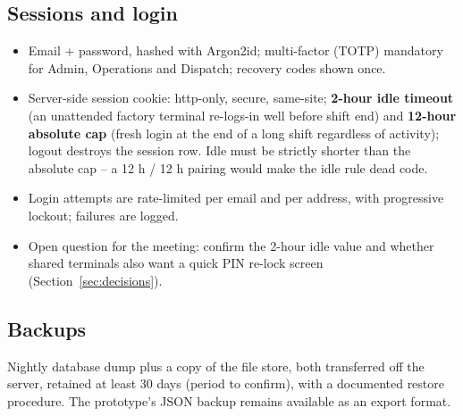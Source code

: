 \subsection*{Sessions and login}

\begin{itemize}
  \item Email + password, hashed with Argon2id; multi-factor (TOTP) mandatory for Admin,
        Operations and Dispatch; recovery codes shown once.
  \item Server-side session cookie: http-only, secure, same-site; \textbf{2-hour idle
        timeout} (an unattended factory terminal re-logs-in well before shift end) and
        \textbf{12-hour absolute cap} (fresh login at the end of a long shift regardless
        of activity); logout destroys the session row. Idle must be strictly shorter
        than the absolute cap -- a 12 h / 12 h pairing would make the idle rule dead
        code.
  \item Login attempts are rate-limited per email and per address, with progressive
        lockout; failures are logged.
  \item Open question for the meeting: confirm the 2-hour idle value and whether shared
        terminals also want a quick PIN re-lock screen
        (Section~\ref{sec:decisions}).
\end{itemize}

\subsection*{Backups}

Nightly database dump plus a copy of the file store, both transferred off the server,
retained at least 30 days (period to confirm), with a documented restore procedure. The
prototype's JSON backup remains available as an export format.
